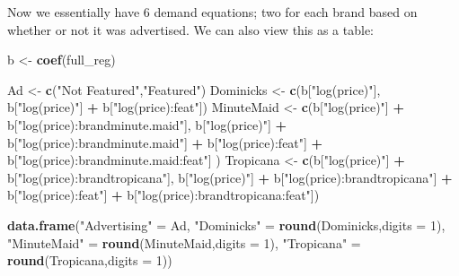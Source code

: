 \documentclass[
]{article}
\newenvironment{Shaded}{\begin{snugshade}}{\end{snugshade}}
\newcommand{\AttributeTok}[1]{\textcolor[rgb]{0.13,0.29,0.53}{#1}}
\newcommand{\DecValTok}[1]{\textcolor[rgb]{0.00,0.00,0.81}{#1}}
\newcommand{\FunctionTok}[1]{\textcolor[rgb]{0.13,0.29,0.53}{\textbf{#1}}}
\newcommand{\NormalTok}[1]{#1}
\newcommand{\OtherTok}[1]{\textcolor[rgb]{0.56,0.35,0.01}{#1}}
\newcommand{\SpecialCharTok}[1]{\textcolor[rgb]{0.81,0.36,0.00}{\textbf{#1}}}
\newcommand{\StringTok}[1]{\textcolor[rgb]{0.31,0.60,0.02}{#1}}
\begin{document}
Now we essentially have 6 demand equations; two for each brand based on
whether or not it was advertised. We can also view this as a table:

\begin{Shaded}
\begin{Highlighting}[]
\NormalTok{b }\OtherTok{\textless{}{-}} \FunctionTok{coef}\NormalTok{(full\_reg)}

\NormalTok{Ad }\OtherTok{\textless{}{-}} \FunctionTok{c}\NormalTok{(}\StringTok{"Not Featured"}\NormalTok{,}\StringTok{"Featured"}\NormalTok{)}
\NormalTok{Dominicks }\OtherTok{\textless{}{-}} \FunctionTok{c}\NormalTok{(b[}\StringTok{"log(price)"}\NormalTok{],}
\NormalTok{               b[}\StringTok{"log(price)"}\NormalTok{] }\SpecialCharTok{+}\NormalTok{ b[}\StringTok{"log(price):feat"}\NormalTok{])}
\NormalTok{MinuteMaid }\OtherTok{\textless{}{-}} \FunctionTok{c}\NormalTok{(b[}\StringTok{"log(price)"}\NormalTok{] }\SpecialCharTok{+}\NormalTok{ b[}\StringTok{"log(price):brandminute.maid"}\NormalTok{],}
\NormalTok{                b[}\StringTok{"log(price)"}\NormalTok{] }\SpecialCharTok{+}\NormalTok{ b[}\StringTok{"log(price):brandminute.maid"}\NormalTok{] }\SpecialCharTok{+}\NormalTok{ b[}\StringTok{"log(price):feat"}\NormalTok{] }\SpecialCharTok{+}\NormalTok{ b[}\StringTok{"log(price):brandminute.maid:feat"}\NormalTok{]}
\NormalTok{                )}
\NormalTok{Tropicana }\OtherTok{\textless{}{-}} \FunctionTok{c}\NormalTok{(b[}\StringTok{"log(price)"}\NormalTok{] }\SpecialCharTok{+}\NormalTok{ b[}\StringTok{"log(price):brandtropicana"}\NormalTok{],}
\NormalTok{               b[}\StringTok{"log(price)"}\NormalTok{] }\SpecialCharTok{+}\NormalTok{ b[}\StringTok{"log(price):brandtropicana"}\NormalTok{] }\SpecialCharTok{+}\NormalTok{ b[}\StringTok{"log(price):feat"}\NormalTok{] }\SpecialCharTok{+}\NormalTok{ b[}\StringTok{"log(price):brandtropicana:feat"}\NormalTok{])}


\FunctionTok{data.frame}\NormalTok{(}\StringTok{"Advertising"} \OtherTok{=}\NormalTok{ Ad,}
           \StringTok{"Dominicks"} \OtherTok{=} \FunctionTok{round}\NormalTok{(Dominicks,}\AttributeTok{digits =} \DecValTok{1}\NormalTok{),}
           \StringTok{"MinuteMaid"} \OtherTok{=} \FunctionTok{round}\NormalTok{(MinuteMaid,}\AttributeTok{digits =} \DecValTok{1}\NormalTok{),}
           \StringTok{"Tropicana"} \OtherTok{=} \FunctionTok{round}\NormalTok{(Tropicana,}\AttributeTok{digits =} \DecValTok{1}\NormalTok{))}
\end{Highlighting}
\end{Shaded}
\end{document}
